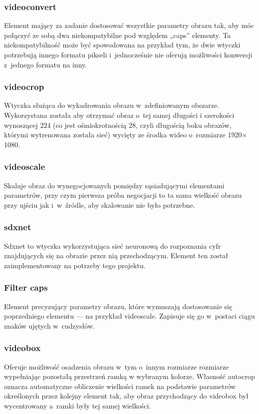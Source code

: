 \documentclass[12pt, oneside, a4paper]{article}
\begin{document}
\subsubsection{videoconvert}
Element mający za zadanie dostosować wszystkie parametry obrazu tak,
aby móc połączyć ze sobą dwa niekompatybilne pod względem „caps” elementy.
Ta niekompatybilność może być spowodowana na przykład tym, że dwie
wtyczki potrzebują innego formatu pikseli i~jednocześnie nie oferują
możliwości konwersji z~jednego formatu na inny.

\subsubsection{videocrop}
Wtyczka służąca do wykadrowania obrazu w~zdefiniowanym obszarze.
Wykorzystana została aby otrzymać obraz o~tej samej długości
i szerokości wynoszącej 224 (co jest ośmiokrotnością 28, czyli
długością boku obrazów, którymi wytrenowana została sieć) wycięty
ze środka wideo o~rozmiarze 1920\(\times \)1080.

\subsubsection{videoscale}
Skaluje obraz do wynegocjowanych pomiędzy sąsiadującymi elementami
parametrów, przy czym pierwsza próba negocjacji to ta sama wielkość
obrazu przy ujściu jak i~w~źródle, aby skalowanie nie było potrzebne.

\subsubsection{sdxnet}
Sdxnet to wtyczka wykorzystująca sieć neuronową do rozpoznania cyfr
znajdujących się na obrazie przez nią przechodzącym. Element ten został
zaimplementowany na potrzeby tego projektu.

\subsubsection{Filter caps}
Element precyzujący parametry obrazu, które wymuszają
dostosowanie się poprzedniego elementu --- na przykład videoscale.
Zapisuje się go w~postaci ciągu znaków ujętych w~cudzysłów.

\subsubsection{videobox}
Oferuje możliwość osadzenia obrazu w~tym o~innym rozmiarze
rozmiarze wypełniając pozostałą przestrzeń ramką
w wybranym kolorze. Własność autocrop oznacza automatyczne obliczenie
wielkości ramek na podstawie parametrów określonych przez kolejny element tak,
aby obraz przychodzący do videobox był wycentrowany a~ramki
były tej samej wielkości.
\end{document}
